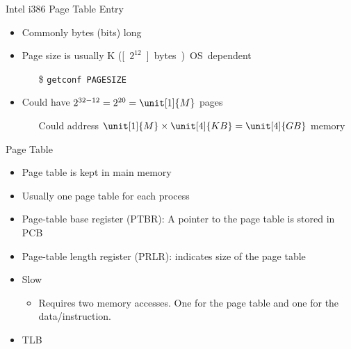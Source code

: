 
\begin{frame}{Intel i386 Page Table Entry}
  \begin{itemize}
  \item Commonly \unit[4]{bytes} (\unit[32]{bits}) long
  \item Page size is usually \unit[4]{K} (\unit[\(2^{12}\)]{bytes}). OS dependent
    \begin{itemize}
    \item[\$] \texttt{getconf PAGESIZE}
    \end{itemize}
  \item Could have \(2^{32-12}=2^{20}=\unit[1]{M}\) pages
    \begin{itemize}
    \item[] Could address \(\unit[1]{M}\times\unit[4]{KB}=\unit[4]{GB}\) memory
    \end{itemize}
  \end{itemize}
  \centering
\end{frame}

\begin{frame}{Page Table}
  \begin{itemize}
  \item Page table is kept in main memory
  \item Usually one page table for each process
  \item \alert{Page-table base register (PTBR):} A pointer to the page table is stored in
    PCB
  \item \alert{Page-table length register (PRLR):} indicates size of the page table
  \item Slow
    \begin{itemize}
    \item Requires two memory accesses. One for the page table and one for the
      data/instruction.
    \end{itemize}
  \item TLB
  \end{itemize}
\end{frame}

